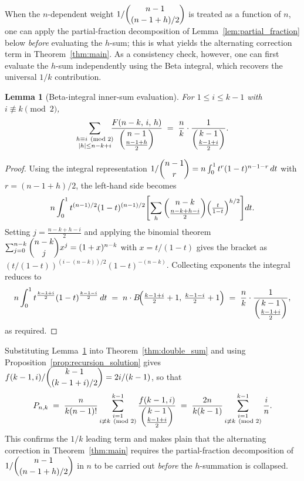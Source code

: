 \documentclass[12pt,a4paper]{article}
\newtheorem{lemma}[theorem]{Lemma}
\theoremstyle{definition}
\renewcommand{\binom}[2]{\dbinom{#1}{#2}}
\newcommand{\abs}[1]{\lvert #1 \rvert}
\begin{document}
When the $n$-dependent weight $1/\binom{n-1}{(n-1+h)/2}$ is treated
as a function of $n$, one can apply the partial-fraction decomposition
of Lemma~\ref{lem:partial_fraction} below \emph{before} evaluating
the $h$-sum; this is what yields the alternating correction term in
Theorem~\ref{thm:main}.  As a consistency check, however, one can
first evaluate the $h$-sum independently using the Beta integral,
which recovers the universal $1/k$ contribution.

\begin{lemma}[Beta-integral inner-sum evaluation]
\label{lem:beta_inner}
For $1\le i\le k-1$ with $i\not\equiv k\pmod{2}$,
\[
\sum_{\substack{h\equiv i\pmod{2}\\
               \abs{h}\le n-k+i}}
\!\!\!
\frac{F(n-k,\,i,\,h)}{\dbinom{n-1}{\frac{n-1+h}{2}}}
\;=\;
\frac{n}{k}\cdot\frac{1}{\dbinom{k-1}{\frac{k-1+i}{2}}}.
\]
\end{lemma}

\begin{proof}
Using the integral representation
$1/\binom{n-1}{r}=n\int_0^1 t^r(1-t)^{n-1-r}\,dt$ with
$r=(n-1+h)/2$, the left-hand side becomes
\[
n\int_0^1 t^{(n-1)/2}(1-t)^{(n-1)/2}
\Biggl[\sum_{h}
  \binom{n-k}{\tfrac{n-k+h-i}{2}}
  \Bigl(\tfrac{t}{1{-}t}\Bigr)^{h/2}
\Biggr]dt.
\]
Setting $j=\frac{n-k+h-i}{2}$ and applying the binomial theorem
$\sum_{j=0}^{n-k}\binom{n-k}{j}x^j=(1+x)^{n-k}$ with $x=t/(1{-}t)$
gives the bracket as $(t/(1{-}t))^{(i-(n-k))/2}(1{-}t)^{-(n-k)}$.
Collecting exponents the integral reduces to
\[
n\int_0^1 t^{\frac{k-1+i}{2}}(1-t)^{\frac{k-1-i}{2}}\,dt
\;=\;
n\cdot B\!\Bigl(\tfrac{k-1+i}{2}+1,\,\tfrac{k-1-i}{2}+1\Bigr)
\;=\;
\frac{n}{k}\cdot\frac{1}{\dbinom{k-1}{\frac{k-1+i}{2}}},
\]
as required.
\end{proof}

Substituting Lemma~\ref{lem:beta_inner} into Theorem~\ref{thm:double_sum}
and using Proposition~\ref{prop:recursion_solution} gives
$f(k-1,i)/\binom{k-1}{(k-1+i)/2}=2i/(k-1)$, so that
\begin{equation}
\label{eq:Pnk_betaeval}
P_{n,k}
\;=\;
\frac{n}{k(n-1)!}
\sum_{\substack{i=1\\i\not\equiv k\pmod{2}}}^{k-1}
\frac{f(k-1,i)}{\dbinom{k-1}{\frac{k-1+i}{2}}}
\;=\;
\frac{2n}{k(k-1)}
\sum_{\substack{i=1\\i\not\equiv k\pmod{2}}}^{k-1}
\frac{i}{n}.
\end{equation}
This confirms the $1/k$ leading term and makes plain that the
alternating correction in Theorem~\ref{thm:main} requires the
partial-fraction decomposition of $1/\binom{n-1}{(n-1+h)/2}$ in $n$
to be carried out \emph{before} the $h$-summation is collapsed.
\end{document}
